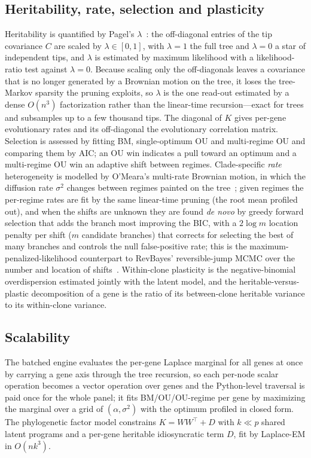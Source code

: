 \documentclass{article}
\begin{document}
\subsection*{Heritability, rate, selection and plasticity}
Heritability is quantified by Pagel's $\lambda$~\cite{pagel_lambda_1999}: the off-diagonal
entries of the tip covariance $C$ are scaled by $\lambda\in[0,1]$, with $\lambda=1$ the full
tree and $\lambda=0$ a star of independent tips, and $\lambda$ is estimated by maximum
likelihood with a likelihood-ratio test against $\lambda=0$. Because scaling only the
off-diagonals leaves a covariance that is no longer generated by a Brownian motion on the
tree, it loses the tree-Markov sparsity the pruning exploits, so $\lambda$ is the one read-out
estimated by a dense $O(n^3)$ factorization rather than the linear-time recursion---exact for
trees and subsamples up to a few thousand tips. The diagonal of $K$ gives per-gene
evolutionary rates and its off-diagonal the evolutionary correlation matrix. Selection is
assessed by fitting BM, single-optimum OU and multi-regime OU and comparing them by AIC; an
OU win indicates a pull toward an optimum and a multi-regime OU win an adaptive shift
between regimes. Clade-specific \emph{rate} heterogeneity is modelled by O'Meara's
multi-rate Brownian motion, in which the diffusion rate $\sigma^2$ changes between regimes
painted on the tree~\cite{omeara_rates_2006}; given regimes the per-regime rates are fit by
the same linear-time pruning (the root mean profiled out), and when the shifts are unknown
they are found \emph{de novo} by greedy forward selection that adds the branch most
improving the BIC, with a $2\log m$ location penalty per shift ($m$ candidate branches) that
corrects for selecting the best of many branches and controls the null false-positive rate;
this is the maximum-penalized-likelihood counterpart to RevBayes' reversible-jump MCMC over
the number and location of shifts~\cite{hohna_revbayes_2016, khabbazian_l1ou_2016}. Within-clone
plasticity is the negative-binomial overdispersion estimated
jointly with the latent model, and the heritable-versus-plastic decomposition of a gene is
the ratio of its between-clone heritable variance to its within-clone variance.

\subsection*{Scalability}
The batched engine evaluates the per-gene Laplace marginal for all genes at once by carrying
a gene axis through the tree recursion, so each per-node scalar operation becomes a vector
operation over genes and the Python-level traversal is paid once for the whole panel; it
fits BM/OU/OU-regime per gene by maximizing the marginal over a grid of $(\alpha,\sigma^2)$
with the optimum profiled in closed form. The phylogenetic factor model constrains
$K = WW^\top + D$ with $k\ll p$ shared latent programs and a per-gene heritable idiosyncratic
term $D$, fit by Laplace-EM in $O(nk^3)$.
\end{document}
